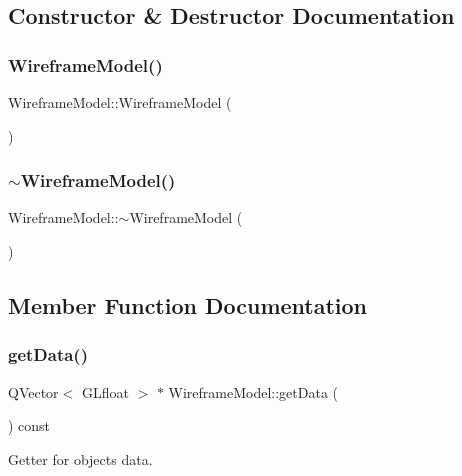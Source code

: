 \subsection{Constructor \& Destructor Documentation}
\mbox{\label{class_wireframe_model_aab69007d1aea9e74f8639d6264e6b61f}} 
\subsubsection{Wireframe\+Model()}
{\footnotesize\ttfamily Wireframe\+Model\+::\+Wireframe\+Model (\begin{DoxyParamCaption}{ }\end{DoxyParamCaption})}

\mbox{\label{class_wireframe_model_a57ec6b8bf2a697a074903d42e4db90d4}} 
\subsubsection{$\sim$\+Wireframe\+Model()}
{\footnotesize\ttfamily Wireframe\+Model\+::$\sim$\+Wireframe\+Model (\begin{DoxyParamCaption}{ }\end{DoxyParamCaption})}



\subsection{Member Function Documentation}
\mbox{\label{class_wireframe_model_a1d20cf72b2f6412985f5fa2fddcec3ee}} 
\subsubsection{get\+Data()}
{\footnotesize\ttfamily Q\+Vector$<$ G\+Lfloat $>$ $\ast$ Wireframe\+Model\+::get\+Data (\begin{DoxyParamCaption}{ }\end{DoxyParamCaption}) const}



Getter for object\textquotesingle{}s data. 

